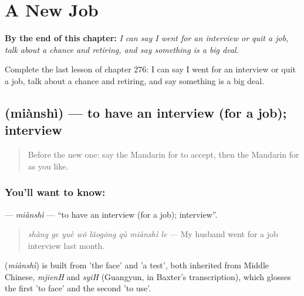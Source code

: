 
\chapter{A New Job}
\label{ch:zh-a-new-job}

\begin{chapteropening}
\textbf{By the end of this chapter:} \emph{I can say I went for an interview or quit a job, talk about a chance and retiring, and say something is a big deal.}

Complete the last lesson of chapter 276: I can say I went for an interview or quit a job, talk about a chance and retiring, and say something is a big deal.
\end{chapteropening}

\section[\texorpdfstring{\zh{面试} (miànshì)}{面试 (miànshì)}]{ (miànshì) — to have an interview (for a job); interview}

\label{lesson:ZH-C276-mianshi}



\begin{quote}
Before the new one: say the Mandarin for to accept, then the Mandarin for as you like.
\end{quote}

\subsection*{You'll want to know: }
\textbf{} — \emph{miànshì} — \textquotedblleft{}to have an interview (for a job); interview\textquotedblright{}.

\begin{quote}
\textbf{} \emph{shàng ge yuè wǒ lǎogōng qù miànshì le} — My husband went for a job interview last month.
\end{quote}

\begin{cousinweb}
\textbf{} (\emph{miànshì}) is built from  'the face' and  'a test', both inherited from Middle Chinese, \emph{mjienH} and \emph{syiH} (Guangyun, in Baxter's transcription), which glosses the first 'to face' and the second 'to use'.
\end{cousinweb}

